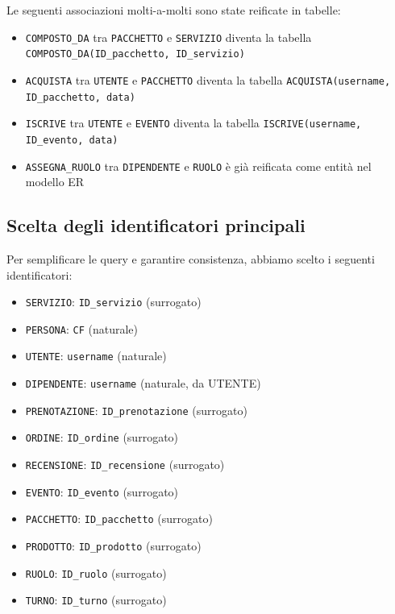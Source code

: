\documentclass[a4paper,12pt]{report}
\begin{document}
Le seguenti associazioni molti-a-molti sono state reificate in tabelle:

\begin{itemize}
    \item \texttt{COMPOSTO\_DA} tra \texttt{PACCHETTO} e \texttt{SERVIZIO} diventa la tabella \texttt{COMPOSTO\_DA(ID\_pacchetto, ID\_servizio)}
    \item \texttt{ACQUISTA} tra \texttt{UTENTE} e \texttt{PACCHETTO} diventa la tabella \texttt{ACQUISTA(username, ID\_pacchetto, data)}
    \item \texttt{ISCRIVE} tra \texttt{UTENTE} e \texttt{EVENTO} diventa la tabella \texttt{ISCRIVE(username, ID\_evento, data)}
    \item \texttt{ASSEGNA\_RUOLO} tra \texttt{DIPENDENTE} e \texttt{RUOLO} è già reificata come entità nel modello ER
\end{itemize}

\subsection{Scelta degli identificatori principali}

Per semplificare le query e garantire consistenza, abbiamo scelto i seguenti identificatori:

\begin{itemize}
    \item \texttt{SERVIZIO}: \texttt{ID\_servizio} (surrogato)
    \item \texttt{PERSONA}: \texttt{CF} (naturale)
    \item \texttt{UTENTE}: \texttt{username} (naturale)
    \item \texttt{DIPENDENTE}: \texttt{username} (naturale, da UTENTE)
    \item \texttt{PRENOTAZIONE}: \texttt{ID\_prenotazione} (surrogato)
    \item \texttt{ORDINE}: \texttt{ID\_ordine} (surrogato)
    \item \texttt{RECENSIONE}: \texttt{ID\_recensione} (surrogato)
    \item \texttt{EVENTO}: \texttt{ID\_evento} (surrogato)
    \item \texttt{PACCHETTO}: \texttt{ID\_pacchetto} (surrogato)
    \item \texttt{PRODOTTO}: \texttt{ID\_prodotto} (surrogato)
    \item \texttt{RUOLO}: \texttt{ID\_ruolo} (surrogato)
    \item \texttt{TURNO}: \texttt{ID\_turno} (surrogato)
\end{itemize}
\end{document}
